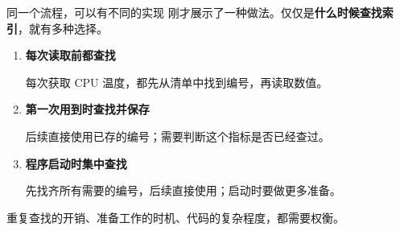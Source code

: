 \documentclass[aspectratio=169]{beamer}
\begin{document}

\begin{frame}{同一个流程，可以有不同的实现}
  刚才展示了一种做法。仅仅是\textbf{什么时候查找索引}，就有多种选择。
  \par\bigskip
  \begin{enumerate}
    \item \textbf{每次读取前都查找}\par
      每次获取 CPU 温度，都先从清单中找到编号，再读取数值。
    \item \textbf{第一次用到时查找并保存}\par
      后续直接使用已存的编号；需要判断这个指标是否已经查过。
    \item \textbf{程序启动时集中查找}\par
      先找齐所有需要的编号，后续直接使用；启动时要做更多准备。
  \end{enumerate}
  \bigskip
  \alert{重复查找的开销、准备工作的时机、代码的复杂程度，都需要权衡。}
\end{frame}
\end{document}
